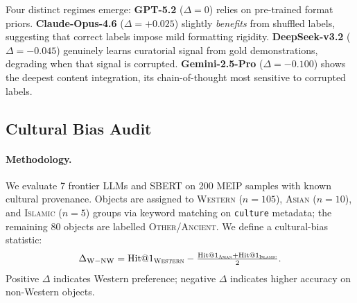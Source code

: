 \documentclass[11pt]{article}
\newcommand{\meip}{\textsc{MEIP}}
\begin{document}
Four distinct regimes emerge:
\textbf{GPT-5.2} ($\Delta{=}0$) relies on pre-trained format priors.
\textbf{Claude-Opus-4.6} ($\Delta{=}{+}0.025$) slightly \emph{benefits}
from shuffled labels, suggesting that correct labels impose mild formatting rigidity.
\textbf{DeepSeek-v3.2} ($\Delta{=}{-}0.045$) genuinely learns curatorial signal
from gold demonstrations, degrading when that signal is corrupted.
\textbf{Gemini-2.5-Pro} ($\Delta{=}{-}0.100$) shows the deepest content integration,
its chain-of-thought most sensitive to corrupted labels.

\subsection{Cultural Bias Audit}
\label{sec:cultural-bias}

\paragraph{Methodology.}
We evaluate 7 frontier LLMs and SBERT on 200 \meip{} samples with known cultural provenance.
Objects are assigned to \textsc{Western} ($n{=}105$), \textsc{Asian} ($n{=}10$),
and \textsc{Islamic} ($n{=}5$) groups via keyword matching on \texttt{culture} metadata;
the remaining 80 objects are labelled \textsc{Other/Ancient}.
We define a cultural-bias statistic:
\begin{equation}
\Delta_{\mathrm{W{-}NW}} =
  \text{Hit@1}_{\textsc{Western}} -
  \tfrac{\text{Hit@1}_{\textsc{Asian}}
        + \text{Hit@1}_{\textsc{Islamic}}}{2}.
\label{eq:delta-wnw}
\end{equation}
Positive $\Delta$ indicates Western preference; negative $\Delta$ indicates higher accuracy on non-Western objects.
\end{document}
